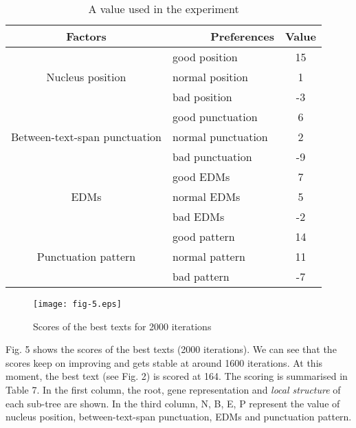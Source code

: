 \documentclass[english]{jnlp_1.2.0}
\begin{document}
\begin{table}[t]
\caption{A value used in the experiment}
\begin{center}
 \begin{tabular}{|c|l|c|}               \hline
  Factors  &~~~~~~Preferences  & Value    \\ \hline \hline
                       & good position      & 15 \\
Nucleus position       & normal position    & 1  \\
                       & bad position       & -3 \\ \hline
                       & good punctuation   & 6  \\
Between-text-span punctuation & normal punctuation & 2  \\
                       & bad punctuation    & -9 \\ \hline
                       & good EDMs          & 7  \\ 
EDMs                   & normal EDMs        & 5  \\
                       & bad EDMs           & -2 \\  \hline
                       & good pattern       & 14 \\ 
Punctuation pattern    & normal pattern     & 11 \\
                       & bad pattern        & -7 \\ \hline 
\end{tabular}
\end{center}
\end{table}

\begin{figure}[t]
\begin{center}
\texttt{[image: fig-5.eps]}
\end{center}
\caption{Scores of the best texts for 2000 iterations}
\end{figure}

Fig. 5 shows the scores of the best texts (2000 iterations). 
We can see that the scores keep on improving and gets stable 
at around 1600 iterations. At this moment, the best text 
(see Fig. 2) is scored at 164. The scoring is summarised 
in Table 7. In the first column, the root, gene representation and 
\textit{local structure} of each sub-tree are shown. In the third column, 
N, B, E, P represent the value of nucleus position, between-text-span punctuation, EDMs 
and punctuation pattern.
\end{document}
